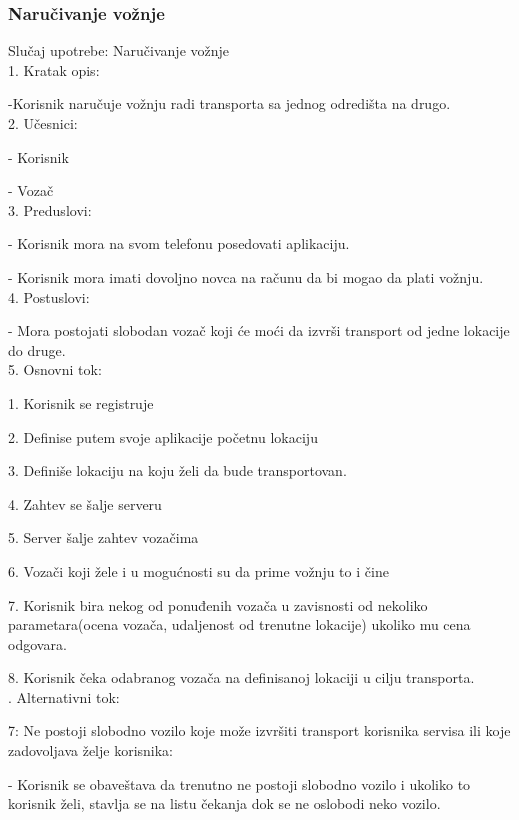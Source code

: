 \subsubsection{\bfseries Naru\v civanje vo\v znje}
\noindent Slučaj upotrebe: Naručivanje vožnje\\
1. Kratak opis:
\par -Korisnik naručuje vožnju radi transporta sa jednog odredišta na drugo. \\
2.  Učesnici:  
\par - Korisnik
\par - Vozač \\
3. Preduslovi: 
\par - Korisnik mora na svom telefonu posedovati aplikaciju.
\par - Korisnik mora imati dovoljno novca na računu da bi mogao da plati vožnju. \\
4. Postuslovi:
\par - Mora postojati slobodan vozač koji će moći da izvrši transport od jedne lokacije do druge.\\
5. Osnovni tok:
\par 1. Korisnik se registruje
\par 2.  Definise putem svoje aplikacije početnu lokaciju
\par 3. Definiše lokaciju na koju želi da bude transportovan.
\par 4. Zahtev se šalje serveru
\par 5. Server šalje zahtev vozačima
\par 6. Vozači koji žele i u mogućnosti su da prime vožnju to i čine
\par 7. Korisnik bira  nekog od ponuđenih vozača u zavisnosti od nekoliko parametara(ocena vozača, udaljenost od trenutne lokacije) ukoliko mu cena odgovara.
\par 8. Korisnik čeka odabranog vozača na definisanoj lokaciji u cilju transporta. \\

. Alternativni tok:
\par 7: Ne postoji slobodno vozilo koje može izvršiti transport korisnika servisa ili koje zadovoljava želje korisnika:
\par - Korisnik se obaveštava da trenutno ne postoji slobodno vozilo i ukoliko to korisnik želi, stavlja se na listu čekanja dok se ne oslobodi neko vozilo.

